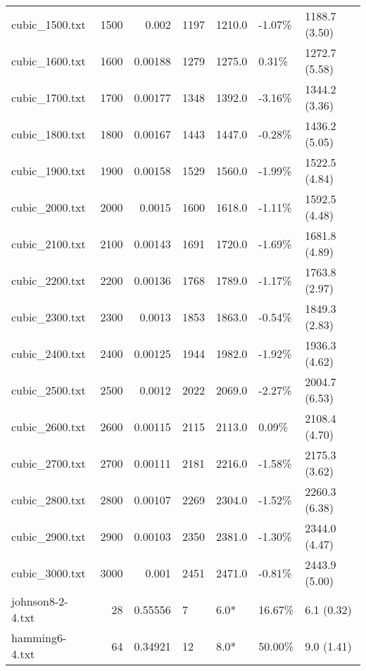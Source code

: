 \begin{table}[h]
\begin{tabular}{lrrllll}
 cubic_1500.txt     &    1500 &     0.002   & 1197         & 1210.0          & -1.07\%  & 1188.7 (3.50)  \\
 cubic_1600.txt     &    1600 &     0.00188 & 1279         & 1275.0          & 0.31\%   & 1272.7 (5.58)  \\
 cubic_1700.txt     &    1700 &     0.00177 & 1348         & 1392.0          & -3.16\%  & 1344.2 (3.36)  \\
 cubic_1800.txt     &    1800 &     0.00167 & 1443         & 1447.0          & -0.28\%  & 1436.2 (5.05)  \\
 cubic_1900.txt     &    1900 &     0.00158 & 1529         & 1560.0          & -1.99\%  & 1522.5 (4.84)  \\
 cubic_2000.txt     &    2000 &     0.0015  & 1600         & 1618.0          & -1.11\%  & 1592.5 (4.48)  \\
 cubic_2100.txt     &    2100 &     0.00143 & 1691         & 1720.0          & -1.69\%  & 1681.8 (4.89)  \\
 cubic_2200.txt     &    2200 &     0.00136 & 1768         & 1789.0          & -1.17\%  & 1763.8 (2.97)  \\
 cubic_2300.txt     &    2300 &     0.0013  & 1853         & 1863.0          & -0.54\%  & 1849.3 (2.83)  \\
 cubic_2400.txt     &    2400 &     0.00125 & 1944         & 1982.0          & -1.92\%  & 1936.3 (4.62)  \\
 cubic_2500.txt     &    2500 &     0.0012  & 2022         & 2069.0          & -2.27\%  & 2004.7 (6.53)  \\
 cubic_2600.txt     &    2600 &     0.00115 & 2115         & 2113.0          & 0.09\%   & 2108.4 (4.70)  \\
 cubic_2700.txt     &    2700 &     0.00111 & 2181         & 2216.0          & -1.58\%  & 2175.3 (3.62)  \\
 cubic_2800.txt     &    2800 &     0.00107 & 2269         & 2304.0          & -1.52\%  & 2260.3 (6.38)  \\
 cubic_2900.txt     &    2900 &     0.00103 & 2350         & 2381.0          & -1.30\%  & 2344.0 (4.47)  \\
 cubic_3000.txt     &    3000 &     0.001   & 2451         & 2471.0          & -0.81\%  & 2443.9 (5.00)  \\
 johnson8-2-4.txt   &      28 &     0.55556 & 7            & 6.0*            & 16.67\%  & 6.1 (0.32)     \\
 hamming6-4.txt     &      64 &     0.34921 & 12           & 8.0*            & 50.00\%  & 9.0 (1.41)     \\

\end{tabular}
\end{table}
